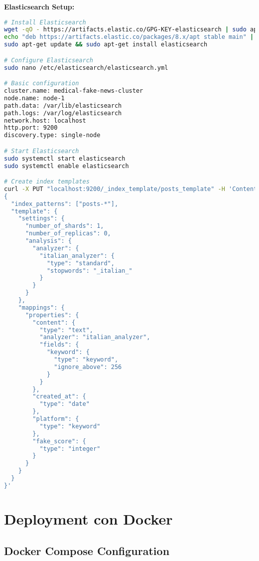 \documentclass[12pt,a4paper]{report}
\begin{document}
\textbf{Elasticsearch Setup:}

\begin{lstlisting}[language=bash, caption=Elasticsearch Configuration]
# Install Elasticsearch
wget -qO - https://artifacts.elastic.co/GPG-KEY-elasticsearch | sudo apt-key add -
echo "deb https://artifacts.elastic.co/packages/8.x/apt stable main" | sudo tee /etc/apt/sources.list.d/elastic-8.x.list
sudo apt-get update && sudo apt-get install elasticsearch

# Configure Elasticsearch
sudo nano /etc/elasticsearch/elasticsearch.yml

# Basic configuration
cluster.name: medical-fake-news-cluster
node.name: node-1
path.data: /var/lib/elasticsearch
path.logs: /var/log/elasticsearch
network.host: localhost
http.port: 9200
discovery.type: single-node

# Start Elasticsearch
sudo systemctl start elasticsearch
sudo systemctl enable elasticsearch

# Create index templates
curl -X PUT "localhost:9200/_index_template/posts_template" -H 'Content-Type: application/json' -d'
{
  "index_patterns": ["posts-*"],
  "template": {
    "settings": {
      "number_of_shards": 1,
      "number_of_replicas": 0,
      "analysis": {
        "analyzer": {
          "italian_analyzer": {
            "type": "standard",
            "stopwords": "_italian_"
          }
        }
      }
    },
    "mappings": {
      "properties": {
        "content": {
          "type": "text",
          "analyzer": "italian_analyzer",
          "fields": {
            "keyword": {
              "type": "keyword",
              "ignore_above": 256
            }
          }
        },
        "created_at": {
          "type": "date"
        },
        "platform": {
          "type": "keyword"
        },
        "fake_score": {
          "type": "integer"
        }
      }
    }
  }
}'
\end{lstlisting}

\section{Deployment con Docker}

\subsection{Docker Compose Configuration}
\end{document}
